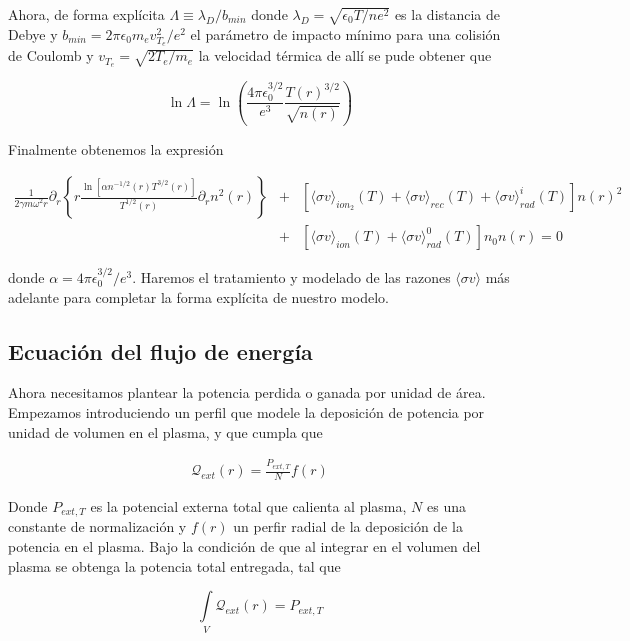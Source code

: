 Ahora, de forma expl\'icita $\Lambda \equiv \lambda_D/b_{min}$ donde $\lambda_D = \sqrt{\epsilon_0 T / n e^2 }$ es la distancia de Debye y $b_{min} = 2\pi \epsilon_0 m_e v_{T_e}^2/e^2$ el par\'ametro de impacto m\'inimo para una colisi\'on de Coulomb y $v_{T_e} = \sqrt{2 T_e / m_e}$ la velocidad t\'ermica \cite{helander2005} de all\'i se pude obtener que 

\begin{equation*}
  \ln{\Lambda} = \ln\left(\frac{4\pi\epsilon_0^{3/2}}{e^3}\frac{T(r)^{3/2}}{\sqrt{n(r)}}\right)
\end{equation*}

Finalmente obtenemos la expresi\'on

\begin{eqnarray}
  \frac{1}{2\gamma m\omega^2 r}\partial_r\left\{r\frac{\ln\left[\alpha n^{-1/2}(r)T^{3/2}(r)\right]}{T^{1/2}(r)}\partial_r n^2(r)\right\} &+& [\langle\sigma v\rangle_{ion_2}(T) + \langle\sigma v\rangle_{rec}(T) + \langle\sigma v\rangle_{rad}^i(T)]n(r)^2 \nonumber\\&+& [\langle\sigma v\rangle_{ion}(T)+ \langle\sigma v\rangle_{rad}^0(T)]n_0n(r) = 0 \label{eq:particleEq}
\end{eqnarray}

donde $\alpha = 4\pi\epsilon_0^{3/2}/e^3$. Haremos el tratamiento y modelado de las razones $\langle \sigma v\rangle$ m\'as adelante para completar la forma expl\'icita de nuestro modelo.

\subsection{Ecuaci\'on del flujo de energ\'ia}

Ahora necesitamos plantear la potencia perdida o ganada por unidad de \'area. Empezamos introduciendo un perfil que modele la deposici\'on de potencia por unidad de volumen en el plasma, y que cumpla que 

\begin{eqnarray*}
  \mathcal{Q}_{ext}(r) = \frac{P_{ext,T}}{N}f(r)
\end{eqnarray*}

Donde $P_{ext,T}$ es la potencial externa total que calienta al plasma, $N$ es una constante de normalizaci\'on y $f(r)$ un perfir radial de la deposici\'on de la potencia en el plasma. Bajo la condici\'on de que al integrar en el volumen del plasma se obtenga la potencia total entregada, tal que 
 
\begin{equation*}
  \int\limits_V \mathcal{Q}_{ext}(r) = P_{ext,T}
\end{equation*}

